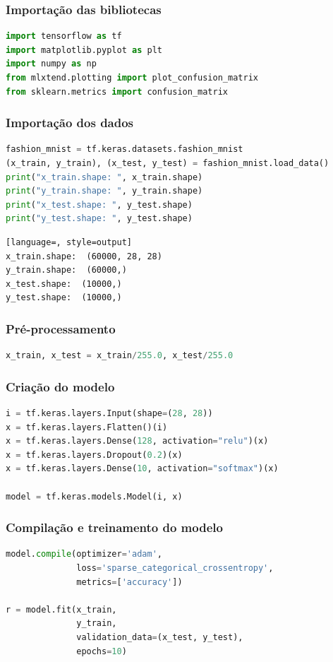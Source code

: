 \subsubsection*{Importação das bibliotecas}
\begin{lstlisting}[language=Python, style=input]
import tensorflow as tf
import matplotlib.pyplot as plt
import numpy as np
from mlxtend.plotting import plot_confusion_matrix
from sklearn.metrics import confusion_matrix
\end{lstlisting}
\subsubsection*{Importação dos dados}
\begin{lstlisting}[language=Python, style=input]
fashion_mnist = tf.keras.datasets.fashion_mnist
(x_train, y_train), (x_test, y_test) = fashion_mnist.load_data()
print("x_train.shape: ", x_train.shape)
print("y_train.shape: ", y_train.shape)
print("x_test.shape: ", y_test.shape)
print("y_test.shape: ", y_test.shape)
\end{lstlisting}
\begin{lstlisting}[language=, style=output]
x_train.shape:  (60000, 28, 28)
y_train.shape:  (60000,)
x_test.shape:  (10000,)
y_test.shape:  (10000,)
\end{lstlisting}
\subsubsection*{Pré-processamento}
\begin{lstlisting}[language=Python, style=input]
x_train, x_test = x_train/255.0, x_test/255.0
\end{lstlisting}
\subsubsection*{Criação do modelo}
\begin{lstlisting}[language=Python, style=input]
i = tf.keras.layers.Input(shape=(28, 28))
x = tf.keras.layers.Flatten()(i)
x = tf.keras.layers.Dense(128, activation="relu")(x)
x = tf.keras.layers.Dropout(0.2)(x)
x = tf.keras.layers.Dense(10, activation="softmax")(x)

model = tf.keras.models.Model(i, x)
\end{lstlisting}
\subsubsection*{Compilação e treinamento do modelo}
\begin{lstlisting}[language=Python, style=input]
model.compile(optimizer='adam',
              loss='sparse_categorical_crossentropy',
              metrics=['accuracy'])

r = model.fit(x_train,
              y_train,
              validation_data=(x_test, y_test),
              epochs=10)
\end{lstlisting}
